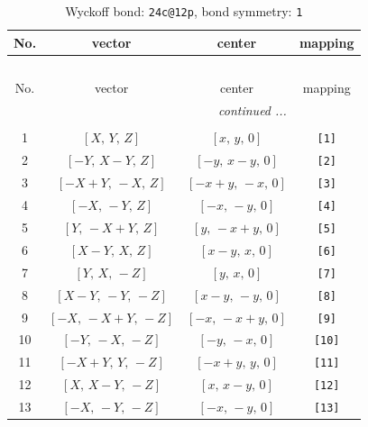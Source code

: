 \documentclass[fleqn,8pt]{jsarticle}
\begin{document}
\begin{longtable}{cccc}
\caption{Wyckoff bond: {\tt 24c@12p}, bond symmetry: {\tt 1}}
 \\
 \hline \hline
No. & vector & center & mapping \\ \hline \endfirsthead

\multicolumn{3}{l}{\tablename\ \thetable{}} \\
 \hline \hline
No. & vector & center & mapping \\ \hline \endhead

 \hline \hline
\multicolumn{3}{r}{\footnotesize\it continued ...} \\ \endfoot

 \hline \hline
\multicolumn{3}{r}{} \\ \endlastfoot

1 & $\left[ X,\, Y,\, Z \right]$ & $\left[ x,\, y,\, 0 \right]$ & {\tt [1]} \\ \hline
2 & $\left[ - Y,\, X - Y,\, Z \right]$ & $\left[ - y,\, x - y,\, 0 \right]$ & {\tt [2]} \\ \hline
3 & $\left[ - X + Y,\, - X,\, Z \right]$ & $\left[ - x + y,\, - x,\, 0 \right]$ & {\tt [3]} \\ \hline
4 & $\left[ - X,\, - Y,\, Z \right]$ & $\left[ - x,\, - y,\, 0 \right]$ & {\tt [4]} \\ \hline
5 & $\left[ Y,\, - X + Y,\, Z \right]$ & $\left[ y,\, - x + y,\, 0 \right]$ & {\tt [5]} \\ \hline
6 & $\left[ X - Y,\, X,\, Z \right]$ & $\left[ x - y,\, x,\, 0 \right]$ & {\tt [6]} \\ \hline
7 & $\left[ Y,\, X,\, - Z \right]$ & $\left[ y,\, x,\, 0 \right]$ & {\tt [7]} \\ \hline
8 & $\left[ X - Y,\, - Y,\, - Z \right]$ & $\left[ x - y,\, - y,\, 0 \right]$ & {\tt [8]} \\ \hline
9 & $\left[ - X,\, - X + Y,\, - Z \right]$ & $\left[ - x,\, - x + y,\, 0 \right]$ & {\tt [9]} \\ \hline
10 & $\left[ - Y,\, - X,\, - Z \right]$ & $\left[ - y,\, - x,\, 0 \right]$ & {\tt [10]} \\ \hline
11 & $\left[ - X + Y,\, Y,\, - Z \right]$ & $\left[ - x + y,\, y,\, 0 \right]$ & {\tt [11]} \\ \hline
12 & $\left[ X,\, X - Y,\, - Z \right]$ & $\left[ x,\, x - y,\, 0 \right]$ & {\tt [12]} \\ \hline
13 & $\left[ - X,\, - Y,\, - Z \right]$ & $\left[ - x,\, - y,\, 0 \right]$ & {\tt [13]} \\ \hline

\end{longtable}
\end{document}
